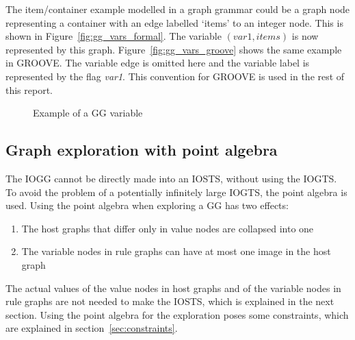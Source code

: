 The item/container example modelled in a graph grammar could be a graph node representing a container with an edge labelled `items' to an integer node. This is shown in Figure~\ref{fig:gg_vars_formal}. The variable $(\mathit{var1, items})$ is now represented by this graph. Figure~\ref{fig:gg_vars_groove} shows the same example in GROOVE. The variable edge is omitted here and the variable label is represented by the flag \textit{var1}. This convention for GROOVE is used in the rest of this report.

\begin{figure}[ht]
  \begin{center}
    \subfloat[Formal]{\label{fig:gg_vars_formal}\parbox[b]{4cm}{\centering}}
    \subfloat[GROOVE]{\label{fig:gg_vars_groove}\parbox[b]{4cm}{\centering}}
  \end{center}
  \caption{Example of a GG variable}
  \label{fig:vars-in-ggs}
\end{figure}

\subsection{Graph exploration with point algebra} 
The IOGG cannot be directly made into an IOSTS, without using the IOGTS. To avoid the problem of a potentially infinitely large IOGTS, the point algebra is used. Using the point algebra when exploring a GG has two effects:
\begin{enumerate}
\item The host graphs that differ only in value nodes are collapsed into one
\item The variable nodes in rule graphs can have at most one image in the host graph
\end{enumerate}
The actual values of the value nodes in host graphs and of the variable nodes in rule graphs are not needed to make the IOSTS, which is explained in the next section. Using the point algebra for the exploration poses some constraints, which are explained in section~\ref{sec:constraints}.

